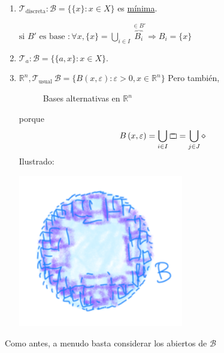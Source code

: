 \begin{ej}
\begin{enumerate}
    \item $\mathcal{T}_{\text{discreta}} : \mathcal{B} = \{\{x\} : x \in X\}$ es \underline{mínima}. 
    \begin{demo}
        $\text{si } B' \text{ es base } : \forall x, \{x\} = \bigcup_{i \in  I} \overbrace{B_i}^{\in B'} \Rightarrow B_i = \{x\}$ 
    \end{demo}
    \item $\mathcal{T}_a: \mathcal{B} = \{\{a, x\} : x \in X\}$.
    \item $\mathbb{R}^n, \mathcal{T}_{\text{usual}}\ \mathcal{B} = \{B\left( x, \varepsilon \right) : \varepsilon > 0, x \in \mathbb{R}^n\}$
    Pero también,
\begin{figure}[H]
    \centering
    \caption{Bases alternativas en $\mathbb{R}^n$}
    \label{fig:bases-alternativas-en-rn}
\end{figure}
    porque
    \[
    B\left( x, \varepsilon \right) = \bigcup_{i \in  I} \ooalign{$\sqsubset\mkern3mu$\cr$\mkern3mu\sqsupset$\cr} = \bigcup_{j \in J} \diamond
    \]
Ilustrado:
    \begin{center}
        \includegraphics[scale=0.3]{images/base_rn} 
    \end{center}
\end{enumerate}

\end{ej}

\begin{pg}
    Como antes, a menudo basta considerar los abiertos de $\mathcal{B}$ 
\end{pg}


